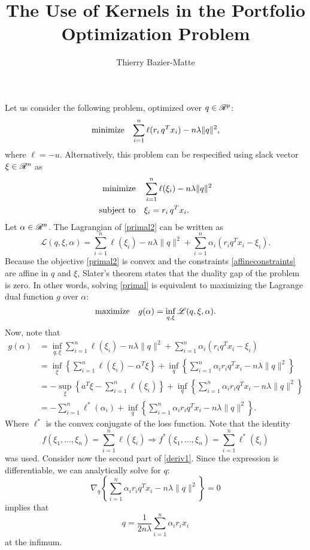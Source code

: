 \documentclass{article}
\title{The Use of Kernels in the Portfolio Optimization Problem}
\author{Thierry Bazier-Matte}
\newcommand{\lag}{\mathscr{L}}
\newcommand{\sumi}{\sum_{i=1}^n}
\begin{document}
\maketitle

Let us consider the following problem, optimized over $q\in\mathscr{R}^p$:
\begin{equation}
  \label{primal}
  \minimizeEquation{\sumi \ell(r_i\,q^Tx_i) - n\lambda\|q\|^2},
\end{equation}
where $\ell=-u$. Alternatively, this problem can be respecified using slack vector
$\xi\in\mathscr{R}^n$ as
\begin{align}
  \minimizeEquationSt{\label{primal2}\sumi \ell(\xi_i) - n\lambda\|q\|^2}[\label{affineconstraints}\xi_i = r_i\,q^Tx_i.] 
\end{align}
Let $\alpha\in\mathscr{R}^n$. The Lagrangian of \eqref{primal2} can be written as
\begin{equation}
  \lag(q,\xi,\alpha) = \sumi \ell(\xi_i) - n\lambda\|q\|^2 + \sumi \alpha_i(r_iq^Tx_i - \xi_i).
\end{equation}
Because the objective \eqref{primal2} is convex and the constraints
\eqref{affineconstraints} are affine in $q$ and $\xi$, Slater's theorem states that the
duality gap of the problem is zero. In other words, solving \eqref{primal} is equivalent
to maximizing the Lagrange dual function $g$ over $\alpha$:
\begin{equation}
  \maximizeEquation{g(\alpha) = \inf_{q,\xi} \lag(q,\xi,\alpha).}
\end{equation}
Now, note that
\begin{align}
  g(\alpha)
  &= \inf_{q,\xi} \sumi \ell(\xi_i) - n\lambda\|q\|^2 + \sumi \alpha_i(r_iq^Tx_i -
    \xi_i)\\
  &= \inf_\xi\left\{\sumi \ell(\xi_i) - \alpha^T\xi\right\} + \inf_q\left\{\sumi \alpha_ir_iq^Tx_i -
    n\lambda\|q\|^2\right\}\\
  & = -\sup_\xi\left\{a^T\xi - \sumi \ell(\xi_i)\right\} + \inf_q\left\{\sumi \alpha_ir_iq^Tx_i -
    n\lambda\|q\|^2\right\}\\
  & = -\sumi \ell^*(\alpha_i) + \inf_q\left\{\sumi \alpha_ir_iq^Tx_i -
    n\lambda\|q\|^2\right\}.\label{deriv1} 
\end{align}
Where $\ell^*$ is the convex conjugate of the loss function. Note that the identity
\begin{equation}
  f(\xi_1,\dots,\xi_n) = \sumi \ell(\xi_i) \Longrightarrow f^*(\xi_1,\dots,\xi_n) = \sumi \ell^*(\xi_i)
\end{equation}
was used. Consider now the second part of \eqref{deriv1}. Since
the expression is differentiable, we can analytically solve for $q$:
\begin{equation}
  \nabla_q \left\{\sumi \alpha_ir_iq^Tx_i -n\lambda\|q\|^2\right\} = 0
\end{equation}
implies that
\begin{equation}
 q = \frac{1}{2n\lambda}\sumi \alpha_ir_ix_i \label{qdef}
\end{equation}
at the infimum.
\end{document}
